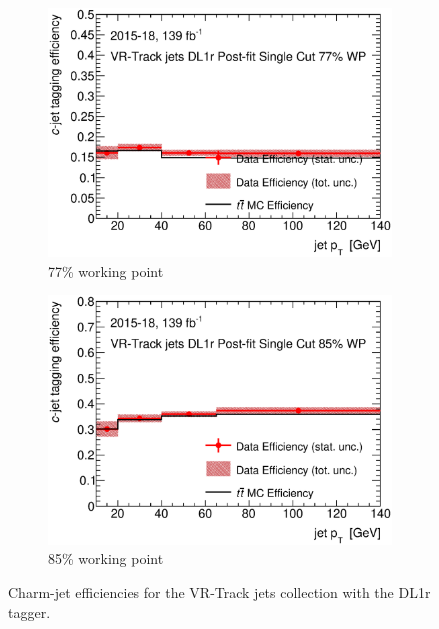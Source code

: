 \begin{figure}[H]
\begin{subfigure}[t]{.35\linewidth}
			\includegraphics[width=1\textwidth]{FTAG_plots/DL1rallVRJetsDec/eff77.eps}
			\caption{77\% working point}
			\end{subfigure}
			\begin{subfigure}[t]{.35\linewidth}
			\includegraphics[width=1\textwidth]{FTAG_plots/DL1rallVRJetsDec/eff85.eps}
			\caption{85\% working point}
			\end{subfigure}
		\caption{Charm-jet efficiencies for the VR-Track jets collection with
		the DL1r tagger.} \label{fig:Dec_eff_VRJets_DL1r}
\end{figure}

